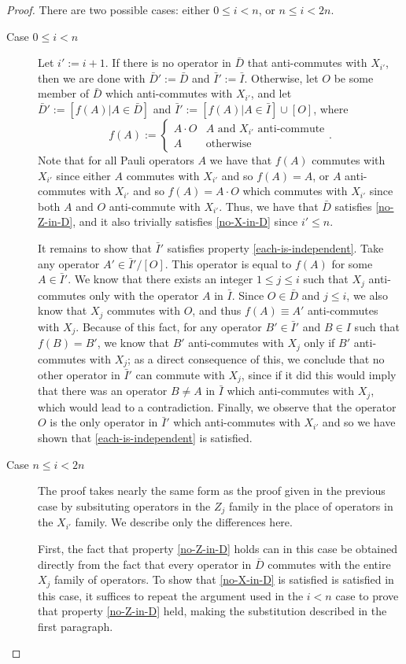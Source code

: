 \documentclass[twocolumn,showpacs,preprintnumbers,amsmath,amssymb,nofootinbib,pra,floatfix]{revtex4}
\begin{document}
\begin{proof}
There are two possible cases:  either $0\le i<n$, or $n\le i < 2n$.
\begin{description}
\item[Case $0\le i<n$] Let $i':=i+1$.  If there is no operator in $\bar D$ that anti-commutes with $X_{i'}$, then we are done with $\bar D':=\bar D$ and $\bar I':=\bar I$.  Otherwise, let $O$ be some member of $\bar D$ which anti-commutes with $X_{i'}$, and let $\bar D':=[f(A)|A\in \bar D]$ and $\bar I':=[f(A)|A\in\bar I]\cup[O]$, where
$$f(A):=\begin{cases}
A\cdot O & \text{$A$ and $X_{i'}$ anti-commute}\\
A & \text{otherwise}
\end{cases}.$$
Note that for all Pauli operators $A$ we have that $f(A)$ commutes with $X_{i'}$ since either $A$ commutes with $X_{i'}$ and so $f(A)=A$, or $A$ anti-commutes with $X_{i'}$ and so $f(A)=A\cdot O$ which commutes with $X_{i'}$ since both $A$ and $O$ anti-commute with $X_{i'}$.  Thus, we have that $\bar D$ satisfies \ref{no-Z-in-D}, and it also trivially satisfies \ref{no-X-in-D} since $i'\le n$.

It remains to show that $\bar I'$ satisfies property \ref{each-is-independent}.  Take any operator $A'\in\bar I'\slash[O]$.  This operator is equal to $f(A)$ for some $A\in \bar I'$.  We know that there exists an integer $1\le j \le i$ such that $X_j$ anti-commutes only with the operator $A$ in $\bar I$.  Since $O\in \bar D$ and $j\le i$, we also know that $X_j$ commutes with $O$, and thus $f(A)\equiv A'$ anti-commutes with $X_j$.  Because of this fact, for any operator $B'\in\bar I'$ and $B\in I$ such that $f(B)=B'$, we know that $B'$ anti-commutes with $X_j$ only if $B'$ anti-commutes with $X_j$;  as a direct consequence of this, we conclude that no other operator in $\bar I'$ can commute with $X_j$, since if it did this would imply that there was an operator $B\ne A$ in $\bar I$ which anti-commutes with $X_j$, which would lead to a contradiction.  Finally, we observe that the operator $O$ is the only operator in $\bar I'$ which anti-commutes with $X_{i'}$ and so we have shown that \ref{each-is-independent} is satisfied.
\item[Case $n\le i<2n$] 
The proof takes nearly the same form as the proof given in the previous case by subsituting operators in the $Z_j$ family in the place of operators in the $X_{i'}$ family.  We describe only the differences here.

First, the fact that property \ref{no-Z-in-D} holds can in this case be obtained directly from the fact that every operator in $\bar D$ commutes with the entire $X_j$ family of operators.  To show that \ref{no-X-in-D} is satisfied is satisfied in this case, it suffices to repeat the argument used in the $i<n$ case to prove that property \ref{no-Z-in-D} held, making the substitution described in the first paragraph.


\end{description}
\end{proof}
\end{document}
